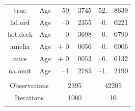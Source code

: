 \documentclass[12pt,econ]{sources/authesis}
\begin{document}
\begin{table}[!htbp]
\begin{tabular}{ccr@{}lr@{}l}
 true & Age & 50.&3745 & 52.&8639 \\
 hd.ord & Age & --0.&2355 & --0.&0221 \\ 
 hot.deck & Age & --0.&3698 & --0.&0790 \\ 
 amelia & Age & + 0.&0056 & --0.&0006 \\
 mice & Age & + 0.&0053 & --0.&0132 \\
 na.omit & Age & --1.&2785 & --1.&2190 \\
 \hline \\[-1.8ex] 
\multicolumn{2}{c}{Observations} & \multicolumn{2}{c}{2395} & \multicolumn{2}{c}{42205} \\ 
\multicolumn{2}{c}{Iterations} & \multicolumn{2}{c}{1000} & \multicolumn{2}{c}{10} \\ 
\hline \\[-1.8ex] 
 \end{tabular} 
 \end{table}
\end{document}
